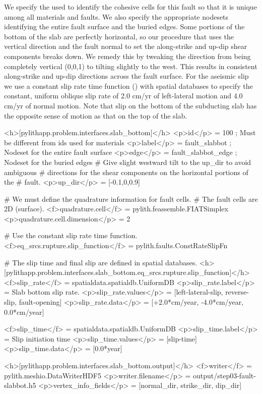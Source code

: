 We specify the  used to identify the cohesive cells for
this fault so that it is unique among all materials and faults. We
also specify the appropriate nodesets identifying the entire fault
surface and the buried edges.  Some portions of the bottom of the slab
are perfectly horizontal, so our procedure that uses the vertical
direction and the fault normal to set the along-strike and up-dip
shear components breaks down. We remedy this by tweaking the
 direction from being completely vertical (0,0,1) to
tilting slightly to the west. This results in consistent along-strike
and up-dip directions across the fault surface. For the aseismic slip
we use a constant slip rate time function ()
with  spatial databases to specify the constant,
uniform oblique slip rate of 2.0 cm/yr of left-lateral motion and 4.0
cm/yr of normal motion. Note that slip on the bottom of the subducting
slab has the opposite sense of motion as that on the top of the slab.
\begin{cfg}
<h>[pylithapp.problem.interfaces.slab_bottom]</h>
<p>id</p> = 100 ; Must be different from ids used for materials
<p>label</p> = fault_slabbot ; Nodeset for the entire fault surface
<p>edge</p> = fault_slabbot_edge ; Nodeset for the buried edges
# Give slight westward tilt to the up_dir to avoid ambiguous
# directions for the shear components on the horizontal portions of the
# fault.
<p>up_dir</p> = [-0.1,0,0.9]

# We must define the quadrature information for fault cells.
# The fault cells are 2D (surface).
<f>quadrature.cell</f> = pylith.feassemble.FIATSimplex
<p>quadrature.cell.dimension</p> = 2

# Use the constant slip rate time function.
<f>eq_srcs.rupture.slip_function</f> = pylith.faults.ConstRateSlipFn

# The slip time and final slip are defined in spatial databases.
<h>[pylithapp.problem.interfaces.slab_bottom.eq_srcs.rupture.slip_function]</h>
<f>slip_rate</f> = spatialdata.spatialdb.UniformDB
<p>slip_rate.label</p> = Slab bottom slip rate.
<p>slip_rate.values</p> = [left-lateral-slip, reverse-slip, fault-opening]
<p>slip_rate.data</p> = [+2.0*cm/year, -4.0*cm/year, 0.0*cm/year]

<f>slip_time</f> = spatialdata.spatialdb.UniformDB
<p>slip_time.label</p>  = Slip initiation time
<p>slip_time.values</p> = [slip-time]
<p>slip_time.data</p> = [0.0*year] 

<h>[pylithapp.problem.interfaces.slab_bottom.output]</h>
<f>writer</f> = pylith.meshio.DataWriterHDF5
<p>writer.filename</p> = output/step03-fault-slabbot.h5
<p>vertex_info_fields</p> = [normal_dir, strike_dir, dip_dir]
\end{cfg}

